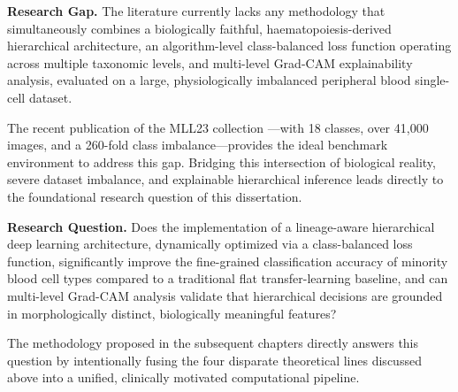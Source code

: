 \documentclass[11pt]{article}
\begin{document}
\begin{gapbox}
\textbf{Research Gap.} The literature currently lacks any methodology that simultaneously combines a biologically faithful, haematopoiesis-derived hierarchical architecture, an algorithm-level class-balanced loss function operating across multiple taxonomic levels, and multi-level Grad-CAM explainability analysis, evaluated on a large, physiologically imbalanced peripheral blood single-cell dataset.
\end{gapbox}

The recent publication of the MLL23 collection \cite{mll23}—with 18 classes, over 41,000 images, and a 260-fold class imbalance—provides the ideal benchmark environment to address this gap. Bridging this intersection of biological reality, severe dataset imbalance, and explainable hierarchical inference leads directly to the foundational research question of this dissertation.

\begin{gapbox}
\textbf{Research Question.} Does the implementation of a lineage-aware hierarchical deep learning architecture, dynamically optimized via a class-balanced loss function, significantly improve the fine-grained classification accuracy of minority blood cell types compared to a traditional flat transfer-learning baseline, and can multi-level Grad-CAM analysis validate that hierarchical decisions are grounded in morphologically distinct, biologically meaningful features?
\end{gapbox}

The methodology proposed in the subsequent chapters directly answers this question by intentionally fusing the four disparate theoretical lines discussed above into a unified, clinically motivated computational pipeline.

\end{document}
